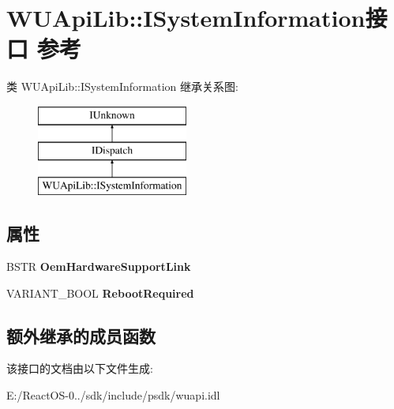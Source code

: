 \hypertarget{interface_w_u_api_lib_1_1_i_system_information}{}\section{W\+U\+Api\+Lib\+:\+:I\+System\+Information接口 参考}
\label{interface_w_u_api_lib_1_1_i_system_information}
类 W\+U\+Api\+Lib\+:\+:I\+System\+Information 继承关系图\+:\begin{figure}[H]
\begin{center}
\leavevmode
\includegraphics[height=3.000000cm]{interface_w_u_api_lib_1_1_i_system_information}
\end{center}
\end{figure}
\subsection*{属性}
\begin{DoxyCompactItemize}
\item 
\mbox{\label{interface_w_u_api_lib_1_1_i_system_information_ab011930fbbd5738303b44b58dd9efb7d}} 
B\+S\+TR {\bfseries Oem\+Hardware\+Support\+Link}
\item 
\mbox{\label{interface_w_u_api_lib_1_1_i_system_information_a3503c9b56dff908b3337c5da541cc848}} 
V\+A\+R\+I\+A\+N\+T\+\_\+\+B\+O\+OL {\bfseries Reboot\+Required}
\end{DoxyCompactItemize}
\subsection*{额外继承的成员函数}


该接口的文档由以下文件生成\+:\begin{DoxyCompactItemize}
\item 
E\+:/\+React\+O\+S-\/0../sdk/include/psdk/wuapi.\+idl\end{DoxyCompactItemize}
